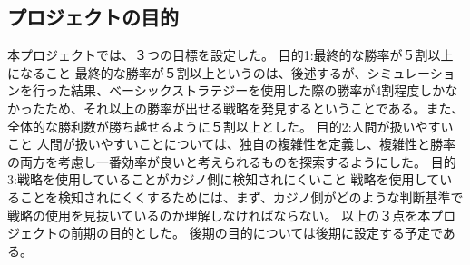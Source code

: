 \subsection{プロジェクトの目的}
本プロジェクトでは、３つの目標を設定した。
目的1:最終的な勝率が５割以上になること
最終的な勝率が５割以上というのは、後述するが、シミュレーションを行った結果、ベーシックストラテジーを使用した際の勝率が4割程度しかなかったため、それ以上の勝率が出せる戦略を発見するということである。また、全体的な勝利数が勝ち越せるように５割以上とした。
目的2:人間が扱いやすいこと
人間が扱いやすいことについては、独自の複雑性を定義し、複雑性と勝率の両方を考慮し一番効率が良いと考えられるものを探索するようにした。
目的3:戦略を使用していることがカジノ側に検知されにくいこと
戦略を使用していることを検知されにくくするためには、まず、カジノ側がどのような判断基準で戦略の使用を見抜いているのか理解しなければならない。
以上の３点を本プロジェクトの前期の目的とした。
後期の目的については後期に設定する予定である。
